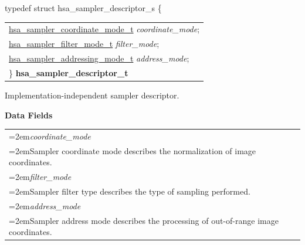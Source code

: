 \documentclass[final]{book}
\newcommand{\reffld}[1]{\textit{#1}}
\begin{document}
\begin{appendices}
\noindent\begin{tcolorbox}[breakable,nobeforeafter,arc=0mm,colframe=white,colback=lightgray,left=0mm]
typedef struct  hsa_sampler_descriptor_s \{
\vspace{-3.5mm}\begin{longtable}{@{}p{\textwidth}}
\hspace{1.7em}\hyperlink{group--images-1ga758676bca930b57be2f532ebc22b3f6f}{hsa_sampler_coordinate_mode_t} \reffld{coordinate_mode};\\
\hspace{1.7em}\hyperlink{group--images-1gae3fdaa83c5d71927e1e49ccaafd49abc}{hsa_sampler_filter_mode_t} \reffld{filter_mode};\\
\hspace{1.7em}\hyperlink{group--images-1gaaf2a640a112084fae3985158fbfd2584}{hsa_sampler_addressing_mode_t} \reffld{address_mode};\\
\}  \hypertarget{group--images-1ga6f791426c190c1eb82a56a5fbee6aa44}{\textbf{hsa_sampler_descriptor_t}}
\end{longtable}

\end{tcolorbox}
Implementation-independent sampler descriptor.

\noindent\textbf{Data Fields}\\[-6mm]
\begin{longtable}{@{}>{\hangindent=2em}p{\textwidth}}
\reffld{coordinate_mode}\\\hspace{2em}Sampler coordinate mode describes the normalization of image coordinates.\\[2mm]
\reffld{filter_mode}\\\hspace{2em}Sampler filter type describes the type of sampling performed.\\[2mm]
\reffld{address_mode}\\\hspace{2em}Sampler address mode describes the processing of out-of-range image coordinates.
\end{longtable}




\end{appendices}
\end{document}
